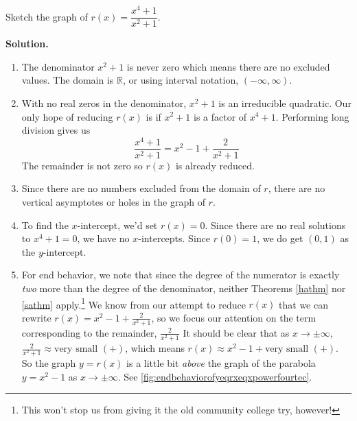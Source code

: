 \begin{ex}   \label{carefulanalysisneeded} Sketch the graph of $r(x) = \dfrac{x^4+1}{x^2+1}$.

{\bf Solution.}

\begin{enumerate}

\item  The denominator $x^2+1$ is never zero which means there are no excluded values.  The domain is $\mathbb{R}$, or using interval notation,  $(-\infty, \infty)$.

\item  With no real zeros in the denominator, $x^2+1$ is an irreducible quadratic.  Our only hope of reducing $r(x)$ is if $x^2+1$ is a factor of $x^4+1$.  Performing long division gives us \[\frac{x^4+1}{x^2+1} = x^2-1+\frac{2}{x^2+1}\] The remainder is not zero so $r(x)$ is already reduced.

\item Since there are no numbers excluded from the domain of $r$, there are no vertical asymptotes or holes in the graph of $r$.

\item  To find the $x$-intercept, we'd set $r(x) = 0$.  Since there are no real solutions to $x^4+1=0$, we have no $x$-intercepts.  Since $r(0) = 1$, we do get $(0,1)$ as the $y$-intercept.

\item  For end behavior, we note that since the degree of the numerator is exactly \textit{two} more than the degree of the denominator, neither Theorems \ref{hathm} nor \ref{sathm} apply.\footnote{This won't stop us from giving it the old community college try, however!} We know from our attempt to reduce $r(x)$ that we can rewrite $r(x) = x^2-1+\frac{2}{x^2+1}$, so we focus our attention on the term corresponding to the remainder, $\frac{2}{x^2+1}$  It should be clear that as $x \rightarrow \pm \infty$, $\frac{2}{x^2+1} \approx \text{very small $(+)$}$, which means $r(x) \approx x^2-1 + \text{very small $(+)$}$.  So the graph $y=r(x)$ is a little bit \textit{above} the graph of the parabola $y=x^2-1$ as $x \rightarrow \pm \infty$. See \autoref{fig:endbehaviorofyeqrxeqxpowerfourtec}.


\end{enumerate}
\end{ex}
